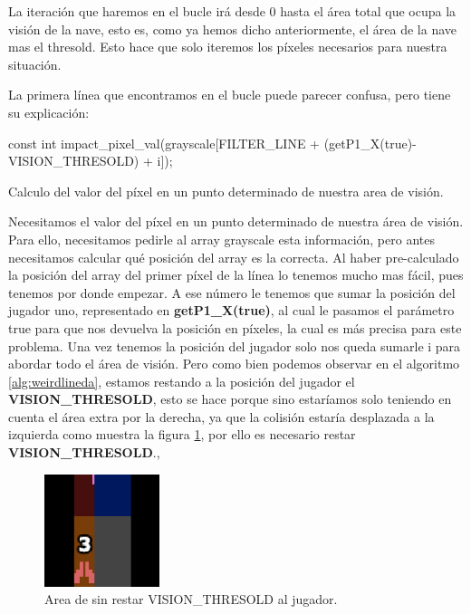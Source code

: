 La iteración que haremos en el bucle irá desde 0 hasta el área total que ocupa la visión de la nave, esto es, como ya hemos dicho anteriormente, el área de la nave mas el thresold. Esto hace que solo iteremos los píxeles necesarios para nuestra situación.

La primera línea que encontramos en el bucle puede parecer confusa, pero tiene su explicación:

\vspace{2mm}
\begin{algorithm}[H]
    const int impact\_pixel\_val(grayscale[FILTER\_LINE + (getP1\_X(true)-VISION\_THRESOLD) + i]);
	\caption{Calculo del valor del píxel en un punto determinado de nuestra area de visión.}
	\label{alg:weirdlineda}
\end{algorithm}
\vspace{2mm}

Necesitamos el valor del píxel en un punto determinado de nuestra área de visión. Para ello, necesitamos pedirle al array grayscale esta información, pero antes necesitamos calcular qué posición del array es la correcta. Al haber pre-calculado la posición del array del primer píxel de la línea lo tenemos mucho mas fácil, pues tenemos por donde empezar. A ese número le tenemos que sumar la posición del jugador uno, representado en \textbf{getP1\_X(true)}, al cual le pasamos el parámetro true para que nos devuelva la posición en píxeles, la cual es más precisa para este problema. Una vez tenemos la posición del jugador solo nos queda sumarle i para abordar todo el área de visión. Pero como bien podemos observar en el algoritmo \ref{alg:weirdlineda}, estamos restando a la posición del jugador el \textbf{VISION\_THRESOLD}, esto se hace porque sino estaríamos solo teniendo en cuenta el área extra por la derecha, ya que la colisión estaría desplazada a la izquierda como muestra la figura 	\ref{fig:colisioncalculadaerroneamenteda}, por ello es necesario restar \textbf{VISION\_THRESOLD}.,

\begin{figure}[h]
	\centering
	\includegraphics[width=0.3\textwidth]{Figures/colisioncalculadaerroneamenteda}
	\caption{Area de sin restar VISION\_THRESOLD al jugador.}
	\label{fig:colisioncalculadaerroneamenteda}
\end{figure}


